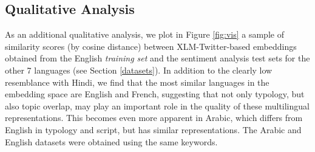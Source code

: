 \documentclass[10pt, a4paper]{article}
\begin{document}
\subsection{Qualitative Analysis}
\label{qualitative}

\vspace{1ex plus 0.5ex}

As an additional qualitative analysis, we plot in Figure \ref{fig:vis} a sample of similarity scores (by cosine distance) between XLM-Twitter-based embeddings obtained from the English \textit{training set} and the sentiment analysis test sets for the other 7 languages (see Section \ref{datasets}). In addition to the clearly low resemblance with Hindi, we find that the most similar languages in the embedding space are English and French, suggesting that not only typology, but also topic overlap, may play an important role in the quality of these multilingual representations. This becomes even more apparent in Arabic, which differs from English in typology and script, but has similar representations. The Arabic and English datasets were obtained using the same keywords.
\end{document}
